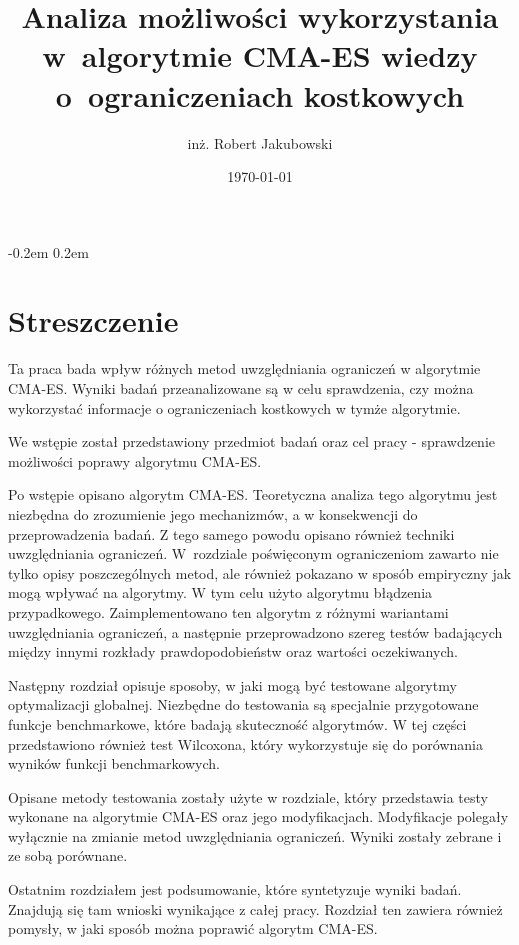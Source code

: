 \documentclass{mini}
\title{Analiza możliwości wykorzystania w~algorytmie CMA-ES wiedzy o~ograniczeniach kostkowych}
\author{inż. Robert Jakubowski}
\date{\today}
\begin{document}
\maketitle

\pagebreak
\thispagestyle{empty}

\openup -0.2em %
\tableofcontents
\openup 0.2em %

\thispagestyle{empty}
\raggedbottom
\pagebreak


\section{Streszczenie}

Ta praca bada wpływ różnych metod uwzględniania ograniczeń w algorytmie CMA-ES. Wyniki badań przeanalizowane są w celu sprawdzenia, czy można wykorzystać informacje o ograniczeniach kostkowych w tymże algorytmie.

We wstępie został przedstawiony przedmiot badań oraz cel pracy - sprawdzenie możliwości poprawy algorytmu CMA-ES.

Po wstępie opisano algorytm CMA-ES. Teoretyczna analiza tego algorytmu jest niezbędna do zrozumienie jego mechanizmów, a w konsekwencji do przeprowadzenia badań. Z tego samego powodu opisano również techniki uwzględniania ograniczeń. W~rozdziale poświęconym ograniczeniom zawarto nie tylko opisy poszczególnych metod, ale również pokazano w sposób empiryczny jak mogą wpływać na algorytmy. W tym celu użyto algorytmu błądzenia przypadkowego. Zaimplementowano ten algorytm z różnymi wariantami uwzględniania ograniczeń, a następnie przeprowadzono szereg testów badających między innymi rozkłady prawdopodobieństw oraz wartości oczekiwanych.

Następny rozdział opisuje sposoby, w jaki mogą być testowane algorytmy optymalizacji globalnej. Niezbędne do testowania są specjalnie przygotowane funkcje benchmarkowe, które badają skuteczność algorytmów. W tej części przedstawiono również test Wilcoxona, który wykorzystuje się do porównania wyników funkcji benchmarkowych.

Opisane metody testowania zostały użyte w rozdziale, który przedstawia testy wykonane na algorytmie CMA-ES oraz jego modyfikacjach. Modyfikacje polegały wyłącznie na zmianie metod uwzględniania ograniczeń. Wyniki zostały zebrane i ze sobą porównane.

Ostatnim rozdziałem jest podsumowanie, które syntetyzuje wyniki badań. Znajdują się tam wnioski wynikające z całej pracy. Rozdział ten zawiera również pomysły, w jaki sposób można poprawić algorytm CMA-ES.
\end{document}
